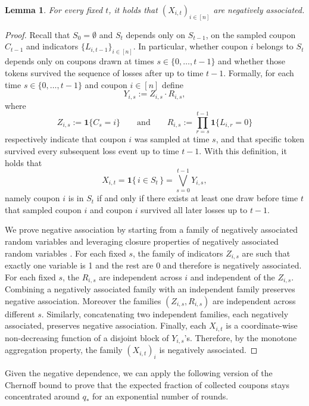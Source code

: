 \documentclass[11pt,a4paper]{article}
\newtheorem{lemma}[theorem]{Lemma}
\begin{document}
\begin{lemma}\label{lem:X_it neg ass}
For every fixed $t$, it holds that $(X_{i,t})_{i\in[n]}$ are negatively associated.
\end{lemma}
\begin{proof}
Recall that $S_0 = \emptyset$ and $S_t$ depends only on $S_{t-1}$, on the sampled coupon $C_{t-1}$ and indicators $\{L_{i,t-1}\}_{i \in [n]}$.
In particular, whether coupon $i$ belongs to $S_t$ depends only on coupons drawn at times $s\in\{0,\dots,t-1\}$ and whether those tokens survived the sequence of losses after up to time $t-1$.
Formally, for each time $s\in\{0,\dots,t-1\}$ and coupon $i\in[n]$ define
\[
	Y_{i,s} := Z_{i,s} \cdot R_{i,s},
\]
where 
\[
    Z_{i,s} := \mathbf{1}\{C_s=i\}
    \qquad\text{and}\qquad
    R_{i,s} := \prod_{r=s}^{t-1}\mathbf{1}\{L_{i,r}=0\}
\]
respectively indicate that coupon $i$ was sampled at time $s$, and that specific token survived every subsequent loss event up to time $t-1$.
With this definition, it holds that
\[
	X_{i,t} = \mathbf{1}\{\,i\in S_t\,\}
	= \bigvee_{s=0}^{t-1} Y_{i,s},
\]
namely coupon $i$ is in $S_t$ if and only if there exists at least one draw before time $t$ that sampled coupon $i$ and coupon $i$ survived all later losses up to $t-1$.

We prove negative association by starting from a family of negatively associated random variables and leveraging closure properties of negatively associated random variables \cite[Chapter~3.1]{dubhashi2009concentration}.
For each fixed $s$, the family of indicators $Z_{i,s}$ are such that exactly one variable is 1 and the rest are 0 and therefore is negatively associated.
For each fixed $s$, the $R_{i,s}$ are independent across $i$ and independent of the $Z_{i,s}$.
Combining a negatively associated family with an independent family preserves negative association.
Moreover the families $(Z_{i,s}, R_{i,s})$ are independent across different $s$.
Similarly, concatenating two independent families, each negatively associated, preserves negative association.
Finally, each $X_{i,t}$ is a coordinate-wise non-decreasing function of a disjoint block of $Y_{i,s}$'s.
Therefore, by the monotone aggregation property, the family $(X_{i,t})_{i}$ is negatively associated.
\end{proof}



Given the negative dependence, we can apply the following version of the Chernoff bound to prove that the expected fraction of collected coupons stays concentrated around $q_*$ for an exponential number of rounds.
\end{document}

